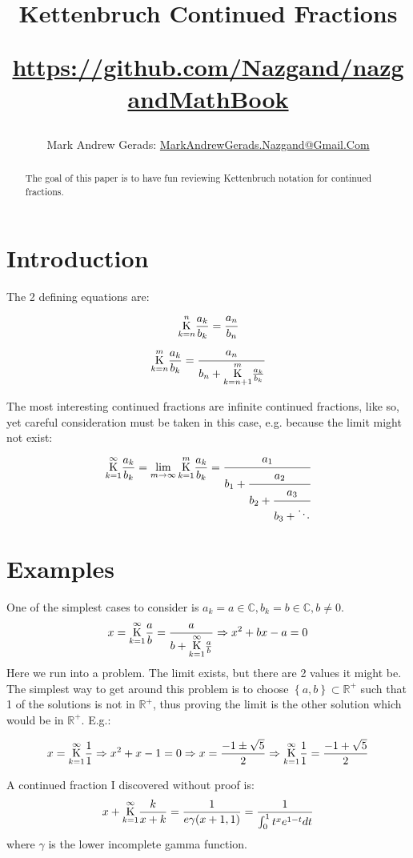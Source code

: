 \documentclass[]{article}
\author{Mark Andrew Gerads: \href{MailTo:MarkAndrewGerads.Nazgand@Gmail.Com}{MarkAndrewGerads.Nazgand@Gmail.Com}}
\title{
	Kettenbruch Continued Fractions
	
	\href{https://github.com/Nazgand/nazgandMathBook}{https://github.com/Nazgand/nazgandMathBook}
}
\newcommand{\Bqty}[1]{{\left\{#1\right\}}}
\newcommand{\ketten}[4]{\underset{#1}{\overset{#2}{\LARGE\mathrm K}}\frac{#3}{#4}}
\numberwithin{equation}{section}
\begin{document}
	
	\maketitle
	
	\begin{abstract}
		The goal of this paper is to have fun reviewing Kettenbruch notation for continued fractions.
	\end{abstract}
	
	\section{Introduction}
	The 2 defining equations are:
	\begin{equation}
		\ketten{k=n}{n}{a_k}{b_k}=\cfrac{a_n}{b_n}
	\end{equation}
	\begin{equation}
		\ketten{k=n}{m}{a_k}{b_k}=\cfrac{a_n}{b_n+\ketten{k=n+1}{m}{a_k}{b_k}}
	\end{equation}

	The most interesting continued fractions are infinite continued fractions, like so, yet careful consideration must be taken in this case, e.g. because the limit might not exist:
	\begin{equation}
		\ketten{k=1}{\infty}{a_k}{b_k}=
		\lim_{m\to\infty}\ketten{k=1}{m}{a_k}{b_k}=
		\cfrac{a_1}{b_1+\cfrac{a_2}{b_2+\cfrac{a_3}{b_3+\ddots}}}
	\end{equation}

	\section{Examples}
	One of the simplest cases to consider is $a_k=a\in\mathbb{C},b_k=b\in\mathbb{C},b\neq 0$.
	\begin{equation}
		x=\ketten{k=1}{\infty}{a}{b}=\frac{a}{b+\ketten{k=1}{\infty}{a}{b}}
		\Rightarrow
		x^2+bx-a=0
	\end{equation}
	Here we run into a problem. The limit exists, but there are 2 values it might be. The simplest way to get around this problem is to choose $\Bqty{a,b}\subset\mathbb{R}^+$ such that 1 of the solutions is not in $\mathbb{R}^+$, thus proving the limit is the other solution which would be in $\mathbb{R}^+$. E.g.:

	\begin{equation}
		x=\ketten{k=1}{\infty}{1}{1}
		\Rightarrow
		x^2+x-1=0
		\Rightarrow
		x=\frac{-1\pm\sqrt{5}}{2}
		\Rightarrow
		\ketten{k=1}{\infty}{1}{1}=\frac{-1+\sqrt{5}}{2}
	\end{equation}

	A continued fraction I discovered without proof is:
	\begin{equation}
		x+\ketten{k=1}{\infty}{k}{x+k}=\frac{1}{e \gamma (x+1,1)}
		=\frac{1}{\int_{0}^{1}t^x e^{1-t}dt}
	\end{equation}
	where $\gamma$ is the lower incomplete gamma function.
\end{document}
